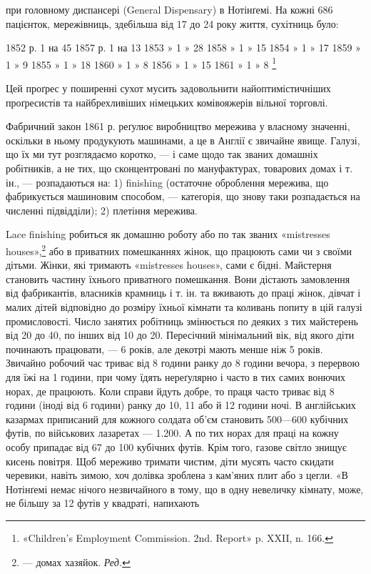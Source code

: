 при головному диспансері (General Dispensary) в Нотінґемі. На
кожні 686 пацієнток, мережівниць, здебільша від 17 до 24 року
життя, сухітниць було:

1852 р.   1    на    45    1857 р.   1   на 13
1853  »   1     »      28    1858   »  1   »    15
1854  »   1     »      17    1859   »  1   »      9
1855  »   1     »      18    1860   »  1   »      8
1856  »   1     »      15    1861   »  1   »      8 \footnote{
«Children’s Employment Commission. 2nd. Report» p. XXII, n. 166.
}

Цей проґрес у поширенні сухот мусить задовольнити найоптимістичніших
проґресистів та найбрехливіших німецьких комівояжерів
вільної торговлі.

Фабричний закон 1861 р. реґулює виробництво мережива
у власному значенні, оскільки в ньому продукують машинами,
а це в Англії є звичайне явище. Галузі, що їх ми тут розглядаємо
коротко, — і саме щодо так званих домашніх робітників, а не
тих, що сконцентровані по мануфактурах, товарових домах і
т. ін., — розпадаються на: 1) finishing (остаточне оброблення
мережива, що фабрикується машиновим способом, — категорія,
що знову таки розпадається на численні підвідділи); 2) плетіння
мережива.

Lace finishing робиться як домашню роботу або по так званих
«mistresses houses»,\footnote*{
— домах хазяйок. \emph{Ред.}
} або в приватних помешканнях жінок, що
працюють сами чи з своїми дітьми. Жінки, які тримають «mistresses
houses», сами є бідні. Майстерня становить частину їхнього
приватного помешкання. Вони дістають замовлення від фабрикантів,
власників крамниць і т. ін. та вживають до праці жінок,
дівчат і малих дітей відповідно до розміру їхньої кімнати та коливань
попиту в цій галузі промисловості. Число занятих робітниць
змінюється по деяких з тих майстерень від 20 до 40, по інших від
10 до 20. Пересічний мінімальний вік, від якого діти починають
працювати, — 6 років, але декотрі мають менше ніж 5 років. Звичайно
робочий час триває від 8 години ранку до 8 години вечора,
з перервою для їжі на 1 години, при чому їдять нереґулярно
і часто в тих самих вонючих норах, де працюють. Коли справи
йдуть добре, то праця часто триває від 8 години (іноді від 6 години)
ранку до 10, 11 або й 12 години ночі. В англійських казармах
приписаний для кожного солдата об’єм становить 500—600 кубічних
футів, по військових лазаретах — 1.200. А по тих норах
для праці на кожну особу припадає від 67 до 100 кубічних
футів. Крім того, газове світло знищує кисень повітря. Щоб
мереживо тримати чистим, діти мусять часто скидати черевики,
навіть зимою, хоч долівка зроблена з кам’яних плит або з цегли.
«В Нотінґемі немає нічого незвичайного в тому, що в одну невеличку
кімнату, може, не більшу за 12 футів у квадраті, напихають